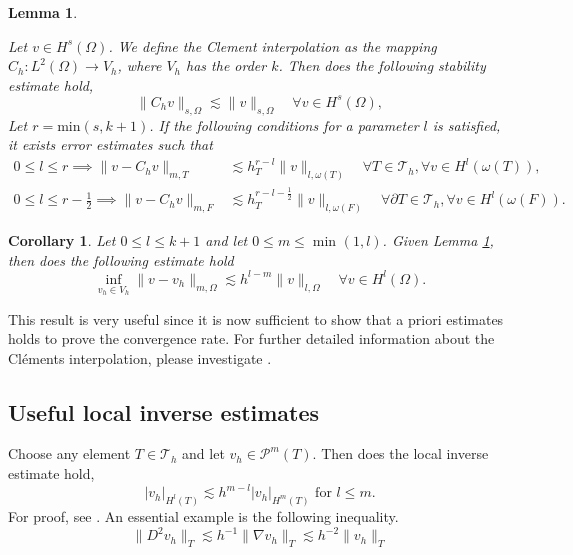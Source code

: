 \documentclass[11pt]{article}
\newtheorem{corollary}[theorem]{Corollary}
\newtheorem{lemma}[theorem]{Lemma}
\theoremstyle{remark}
\newcommand{\abs}[1]{\left\lvert #1 \right\rvert}
\renewcommand{\le}{\leqslant}
\numberwithin{equation}{section}
\begin{document}
\begin{lemma}
    \label{lemma:clements}

    Let $v \in H^{s}( \Omega ) $. We define the Clement interpolation as the mapping
$C_{h}: L^{2}( \Omega )   \to  V_{h}$, where $V_{h}$ has the order $k$. Then does the following stability estimate hold,
\[
 \| C_{h} v \|_{ s, \Omega     }^{  } \lesssim \| v \|_{ s, \Omega   }^{  } \quad \forall v \in H^{s}( \Omega ) ,
\]
Let $r = \mathrm{min} ( s, k+1) $. If the following conditions for a parameter $l$ is satisfied, it exists error estimates such that
\begin{equation}
    \begin{split}
      0\le l \le r  \implies \| v - C_{h} v \|_{ m,T   }^{  }  &  \lesssim h^{r-l}_{T} \| v \|_{l,\omega \left( T \right)  }^{  } \quad  \forall T \in \mathcal{T} _{h}, \forall v \in H^{l}( \omega \left( T \right)
      ), \\
      0\le l \le r-\frac{1}{2}  \implies \| v - C_{h} v \|_{ m,F }^{  } & \lesssim h^{r - l - \frac{1}{2}}_{T} \| v \|_{l,\omega \left( F \right)  }^{  } \quad  \forall \partial T \in \mathcal{T} _{h}, \forall v \in H^{l}( \omega \left( F
      \right)).
    \end{split}
\end{equation}

\end{lemma}


\begin{corollary}
    \label{cor:celement_apriori}
    Let $0 \le l \le k+1$ and let $0\le m \le \min_{} ( 1,l )$.
    Given Lemma \ref{lemma:clements}, then does the following estimate hold
    \begin{equation}
        \inf_{v_{h} \in V_{h} } \| v - v_{h} \|_{  m,\Omega }^{  } \lesssim   h^{l-m}  \| v \|_{ l,\Omega  }^{  } \quad     \forall v \in H^{l}( \Omega ).
    \end{equation}
\end{corollary}
This result is very useful since it is now sufficient to show that a priori estimates holds to prove the convergence rate. For further detailed information about the Cléments interpolation, please investigate \cite[Chapter 1.6]{ern04}.

\subsection{Useful local inverse estimates}%
\label{sub:some_general_inequalities}


    Choose any element $T \in \mathcal{T}_{h} $ and let $v_{h} \in \mathcal{P} ^{m}( T)   $. Then does the local inverse estimate hold,
\begin{equation}
\label{eq:inv1}
\abs{ v_{h} }_{H^{l}( T) }  \lesssim h^{m-l} \abs{ v_{h} }_{H^{m}( T  ) }
\text{ for } l \le m.
\end{equation}
 For proof, see \cite[Lemma 12.1]{ErnGuermond2021}. An essential example is the following inequality.
 \begin{equation}
     \label{eq:degrade}
\| D^2v_{h} \|_{T  }^{  } \lesssim h^{-1} \| \nabla v_{h}  \|_{ T  }^{  } \lesssim h^{-2} \| v_{h} \|_{T  }^{  }
 \end{equation}
\end{document}
